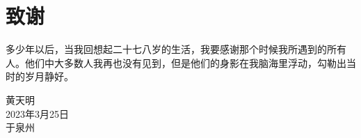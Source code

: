 \chapter{致\texorpdfstring{\qquad}{}谢}
多少年以后，当我回想起二十七八岁的生活，我要感谢那个时候我所遇到的所有人。他们中大多数人我再也没有见到，但是他们的身影在我脑海里浮动，勾勒出当时的岁月静好。


\begin{minipage}[t]{0.945\textwidth}%
	\begin{flushright}
		黄天明\\
		2023年3月25日\\	%
		于泉州
		\par\end{flushright}
\end{minipage}

